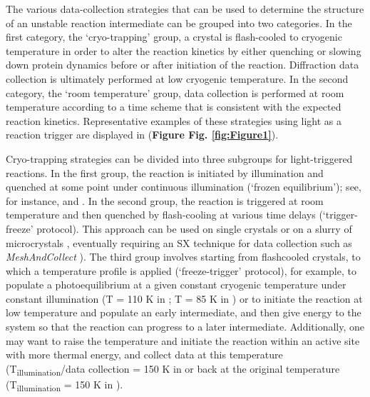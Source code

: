 The various data-collection strategies that can be used to determine the structure of an unstable reaction intermediate can be grouped into two categories. In the first category, the ‘cryo-trapping’ group, a crystal is flash-cooled to cryogenic temperature in order to alter the reaction kinetics by either quenching or slowing down protein dynamics before or after initiation of the reaction. Diffraction data collection is ultimately performed at low cryogenic temperature. In the second category, the ‘room temperature’ group, data collection is performed at room temperature according to a time scheme that is consistent with the expected reaction kinetics. Representative examples of these strategies using light as a reaction trigger are displayed in (\textbf{Figure Fig. \ref{fig:Figure1}}).

Cryo-trapping strategies can be divided into three subgroups for light-triggered reactions. In the first group, the reaction is initiated by illumination and quenched at some point under continuous illumination (‘frozen equilibrium’); see, for instance, \cite{fedorovCrystalStructuresMolecular2003} and \cite{gotthardSpecificRadiationDamage2019}. In the second group, the reaction is triggered at room temperature and then quenched by flash-cooling at various time delays (‘trigger-freeze’ protocol). This approach can be used on single crystals \parencite{basuWatchingBacteriophageN42013} or on a slurry of microcrystals \parencite{sugaOxylOxoMechanism2019}, eventually requiring an SX technique for data collection such as \textit{MeshAndCollect} \parencite{zanderMeshAndCollectAutomatedMulticrystal2015}). The third group involves starting from flashcooled crystals, to which a temperature profile is applied (‘freeze-trigger’ protocol), for example, to populate a photoequilibrium at a given constant cryogenic temperature under constant illumination (T = 110 K in \cite{edmanHighresolutionXrayStructure1999}; T = 85 K in \cite{kortInitialEventsPhotocycle2004}) or to initiate the reaction at low temperature and populate an early intermediate, and then give energy to the system so that the reaction can progress to a later intermediate. Additionally, one may want to raise the temperature and initiate the reaction within an active site with more thermal energy, and collect data at this temperature (T\textsubscript{illumination}/data collection = 150 K in \cite{sorigueMechanismDynamicsFatty2021} or back at the original temperature (T\textsubscript{illumination} = 150 K in \cite{edmanDeformationHelixLow2004}).

